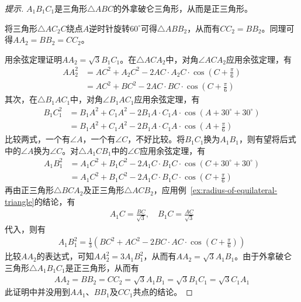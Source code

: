 \begin{example}[南京，1978]
\begin{center}
  \end{center}
\end{example}
\begin{proof}[提示]
  $A_1B_1C_1$是三角形$\triangle ABC$的外拿破仑三角形，从而是正三角形。

  将三角形$\triangle AC_2C$绕点$A$逆时针旋转$60^\circ$可得$\triangle ABB_2$，从而有$CC_2=BB_2$。同理可得$AA_2=BB_2=CC_2$。

  
  用余弦定理证明$AA_2=\sqrt3B_1C_1$。在$\triangle ACA_2$中，对角$\angle ACA_2$应用余弦定理，有
  \begin{align*}
    AA_2^2 &= AC^2 + A_2C^2 - 2AC\cdot A_2C\cdot\cos(C+\frac\pi6)\\
           &= AC^2 + BC^2 - 2AC\cdot BC\cdot\cos(C+\frac\pi6)
  \end{align*}
  其次，在$\triangle B_1AC_1$中，对角$\angle B_1AC_1$应用余弦定理，有
  \begin{align*}
    B_1C_1^2 & = B_1A^2 + C_1A^2 - 2B_1A\cdot C_1A\cdot \cos(A+30^\circ + 30^\circ) \\
             &= B_1A^2 + C_1A^2 - 2B_1A\cdot C_1A\cdot \cos(A+\frac\pi6)
  \end{align*}
  比较两式，一个有$\angle A$，一个有$\angle C$，不好比较。将$B_1C_1$换为$A_1B_1$，则有望将后式中的$\angle A$换为$\angle C$。对$\triangle A_1CB_1$中的$\angle C$应用余弦定理，有
  \begin{align*}
    A_1B_1^2 &= A_1C^2 + B_1C^2 - 2A_1C\cdot B_1C\cdot\cos(C + 30^\circ + 30^\circ)\\
             & = A_1C^2 + B_1C^2 - 2A_1C\cdot B_1C\cdot\cos(C + \frac\pi6)
  \end{align*}
  再由正三角形$\triangle BCA_2$及正三角形$\triangle ACB_2$，应用例~\ref{ex:radius-of-equilateral-triangle}的结论，有
  \begin{align*}
    A_1C = \frac{BC}{\sqrt3},\quad B_1C = \frac{AC}{\sqrt3}
  \end{align*}
  代入，则有
  \begin{align*}
    A_1B_1^2 = \frac13\left(BC^2 + AC^2 - 2 BC\cdot AC\cdot\cos(C + \frac\pi6)\right)
  \end{align*}
  比较$AA_2$的表达式，可知$AA_2^2 = 3A_1B_1^2$，从而有$AA_2=\sqrt3 A_1B_1$。由于外拿破仑三角形$\triangle A_1B_1C_1$是正三角形，从而有
  \begin{align*}
    AA_2=BB_2=CC_2=\sqrt3 A_1B_1 = \sqrt3 B_1C_1 = \sqrt3 C_1A_1 
  \end{align*}
  此证明中并没用到$AA_1$、$BB_1$及$CC_1$共点的结论。
\end{proof}

